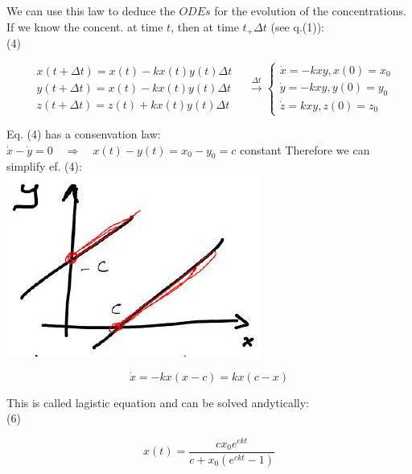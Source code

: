 \documentclass[10pt]{article}
\begin{document}
We can use this law to deduce the $O D E s$ for the evolution of the concentrations. If we know the concent. at time $t$, then at time $t_{+} \Delta t$ (see q.(1)):\\
(4)

$$
\begin{aligned}
& x(t+\Delta t)=x(t)-k x(t) y(t) \Delta t \\
& y(t+\Delta t)=x(t)-k x(t) y(t) \Delta t \\
& z(t+\Delta t)=z(t)+k x(t) y(t) \Delta t
\end{aligned} \quad \xrightarrow{\Delta t}\left\{\begin{array}{l}
\dot{x}=-k x y, x(0)=x_{0} \\
\dot{y}=-k x y, y(0)=y_{0} \\
\dot{z}=k x y, z(0)=z_{0}
\end{array}\right.
$$

Eq. (4) has a consenvation law:\\
$\dot{x}-\dot{y}=0 \quad \Rightarrow \quad x(t)-y(t)=x_{0}-y_{0}=c$ constant Therefore we can simplify ef. (4):\\
\includegraphics[max width=\textwidth, center]{2025_10_17_109d3ce1ba98c27731a1g-3}


\begin{equation*}
\dot{x}=-k x(x-c)=k x(c-x) \tag{5}
\end{equation*}


This is called lagistic equation and can be solved andytically:\\
(6)

$$
x(t)=\frac{c x_{0} e^{c k t}}{c+x_{0}\left(e^{c k t}-1\right)}
$$
\end{document}
